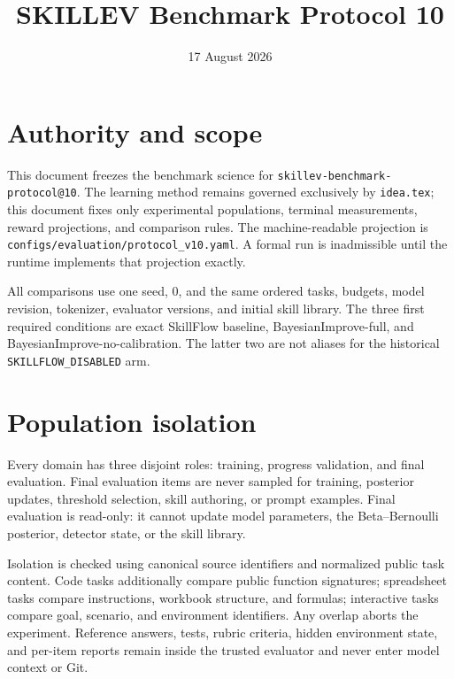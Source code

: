 \documentclass[11pt]{article}
\title{SKILLEV Benchmark Protocol 10}
\date{17 August 2026}
\begin{document}
\maketitle

\section{Authority and scope}

This document freezes the benchmark science for
\texttt{skillev-benchmark-protocol@10}.  The learning method remains governed
exclusively by \texttt{idea.tex}; this document fixes only experimental
populations, terminal measurements, reward projections, and comparison rules.
The machine-readable projection is
\texttt{configs/evaluation/protocol\_v10.yaml}.  A formal run is inadmissible
until the runtime implements that projection exactly.

All comparisons use one seed, 0, and the same ordered tasks, budgets, model
revision, tokenizer, evaluator versions, and initial skill library.  The three
first required conditions are exact SkillFlow baseline,
BayesianImprove-full, and BayesianImprove-no-calibration.  The latter two are
not aliases for the historical \texttt{SKILLFLOW\_DISABLED} arm.

\section{Population isolation}

Every domain has three disjoint roles: training, progress validation, and
final evaluation.  Final evaluation items are never sampled for training,
posterior updates, threshold selection, skill authoring, or prompt examples.
Final evaluation is read-only: it cannot update model parameters, the
Beta--Bernoulli posterior, detector state, or the skill library.

Isolation is checked using canonical source identifiers and normalized public
task content.  Code tasks additionally compare public function signatures;
spreadsheet tasks compare instructions, workbook structure, and formulas;
interactive tasks compare goal, scenario, and environment identifiers.  Any
overlap aborts the experiment.  Reference answers, tests, rubric criteria,
hidden environment state, and per-item reports remain inside the trusted
evaluator and never enter model context or Git.
\end{document}
